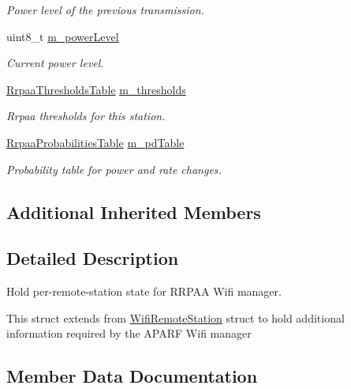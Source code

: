 \begin{DoxyCompactItemize}
\begin{DoxyCompactList}\small\item\em Power level of the previous transmission. \end{DoxyCompactList}\item 
uint8\+\_\+t \hyperlink{structns3_1_1RrpaaWifiRemoteStation_ad02728c1a6691acc74844587468f95b4}{m\+\_\+power\+Level}
\begin{DoxyCompactList}\small\item\em Current power level. \end{DoxyCompactList}\item 
\hyperlink{namespacens3_a07e3435ea7b0625f3b3abcbec4416523}{Rrpaa\+Thresholds\+Table} \hyperlink{structns3_1_1RrpaaWifiRemoteStation_a7a00d06363375d104c1aff7ee1218b2a}{m\+\_\+thresholds}
\begin{DoxyCompactList}\small\item\em Rrpaa thresholds for this station. \end{DoxyCompactList}\item 
\hyperlink{namespacens3_a120051d4d36bbbc9b101cb0012cb1e48}{Rrpaa\+Probabilities\+Table} \hyperlink{structns3_1_1RrpaaWifiRemoteStation_ae520e6c006b1d0854d476a8b4cdd3208}{m\+\_\+pd\+Table}
\begin{DoxyCompactList}\small\item\em Probability table for power and rate changes. \end{DoxyCompactList}\end{DoxyCompactItemize}
\subsection*{Additional Inherited Members}


\subsection{Detailed Description}
Hold per-\/remote-\/station state for R\+R\+P\+AA Wifi manager.

This struct extends from \hyperlink{structns3_1_1WifiRemoteStation}{Wifi\+Remote\+Station} struct to hold additional information required by the A\+P\+A\+RF Wifi manager 

\subsection{Member Data Documentation}
